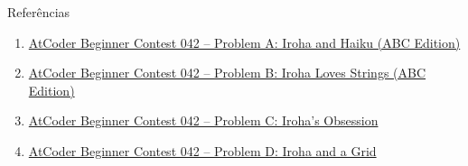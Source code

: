 \begin{frame}[fragile]{Referências}

    \begin{enumerate}
        \item \href{https://atcoder.jp/contests/abc042/tasks/abc042_a}{AtCoder Beginner Contest
            042 -- Problem A: Iroha and Haiku (ABC Edition)} 

        \item \href{https://atcoder.jp/contests/abc042/tasks/abc042_b}{AtCoder Beginner Contest
            042 -- Problem B: Iroha Loves Strings (ABC Edition)} 

        \item \href{https://atcoder.jp/contests/abc042/tasks/arc058_a}{AtCoder Beginner Contest
            042 -- Problem C: Iroha's Obsession}

        \item \href{https://atcoder.jp/contests/abc042/tasks/arc058_b}{AtCoder Beginner Contest
            042 -- Problem D: Iroha and a Grid}
    \end{enumerate}

\end{frame}
